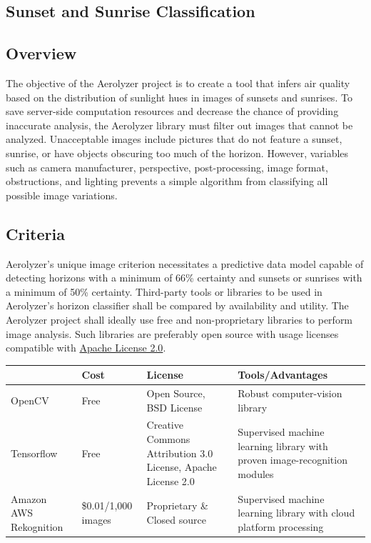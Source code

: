 \documentclass[onecolumn, draftclsnofoot,10pt, compsoc]{IEEEtran}
\begin{document}
\begin{singlespace}

\section{Sunset and Sunrise Classification}
	\subsection{Overview}
		The objective of the Aerolyzer project is to create a tool that infers air quality based on the distribution of sunlight hues in images of sunsets and sunrises.
		To save server-side computation resources and decrease the chance of providing inaccurate analysis, the Aerolyzer library must filter out images that cannot be analyzed.
		Unacceptable images include pictures that do not feature a sunset, sunrise, or have objects obscuring too much of the horizon.
		However, variables such as camera manufacturer, perspective, post-processing, image format, obstructions, and lighting prevents a simple algorithm from classifying all possible image variations.
	
	\subsection{Criteria}
		Aerolyzer’s unique image criterion necessitates a predictive data model capable of detecting horizons with a minimum of 66\% certainty and sunsets or sunrises with a minimum of 50\% certainty.
		Third-party tools or libraries to be used in Aerolyzer’s horizon classifier shall be compared by availability and utility.
		The Aerolyzer project shall ideally use free and non-proprietary libraries to perform image analysis.
		Such libraries are preferably open source with usage licenses compatible with \href{https://www.apache.org/licenses/LICENSE-2.0}{Apache License 2.0}.

		\begin{center}
			\begin{tabular}{|l|p{3cm}|p{4cm}|p{5cm}|}
			\hline \textbf{} & \textbf{Cost} & \textbf{License} & \textbf{Tools/Advantages} \\\hline
			OpenCV & Free & Open Source, BSD License & Robust computer-vision library\\\hline
			Tensorflow & Free & Creative Commons Attribution 3.0 License, Apache License 2.0 & Supervised machine learning library with proven image-recognition modules\\\hline
			Amazon AWS Rekognition & \$0.01/1,000 images & Proprietary \& Closed source& Supervised machine learning library with cloud platform processing\\\hline
			\end{tabular}
		\end{center}


\end{singlespace}
\end{document}

